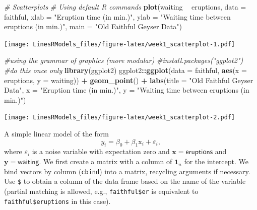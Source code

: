 \documentclass[]{book}
\newenvironment{Shaded}{\begin{snugshade}}{\end{snugshade}}
\newcommand{\KeywordTok}[1]{\textcolor[rgb]{0.13,0.29,0.53}{\textbf{#1}}}
\newcommand{\DataTypeTok}[1]{\textcolor[rgb]{0.13,0.29,0.53}{#1}}
\newcommand{\StringTok}[1]{\textcolor[rgb]{0.31,0.60,0.02}{#1}}
\newcommand{\CommentTok}[1]{\textcolor[rgb]{0.56,0.35,0.01}{\textit{#1}}}
\newcommand{\OperatorTok}[1]{\textcolor[rgb]{0.81,0.36,0.00}{\textbf{#1}}}
\newcommand{\NormalTok}[1]{#1}
\theoremstyle{definition}
\theoremstyle{definition}
\theoremstyle{definition}
\theoremstyle{remark}
\begin{document}
\begin{Shaded}
\begin{Highlighting}[]
\CommentTok{# Scatterplots}
\CommentTok{# Using default R commands}
\KeywordTok{plot}\NormalTok{(waiting }\OperatorTok{~}\StringTok{ }\NormalTok{eruptions, }\DataTypeTok{data =}\NormalTok{ faithful, }
     \DataTypeTok{xlab =} \StringTok{"Eruption time (in min.)"}\NormalTok{, }
     \DataTypeTok{ylab =} \StringTok{"Waiting time between eruptions (in min.)"}\NormalTok{,}
     \DataTypeTok{main =} \StringTok{"Old Faithful Geyser Data"}\NormalTok{)}
\end{Highlighting}
\end{Shaded}

\texttt{[image: LinesRModels\_files/figure-latex/week1\_scatterplot-1.pdf]}

\begin{Shaded}
\begin{Highlighting}[]
\CommentTok{#using the grammar of graphics (more modular)}
\CommentTok{#install.packages("ggplot2") #do this once only}
\KeywordTok{library}\NormalTok{(ggplot2)}
\NormalTok{ggplot2}\OperatorTok{::}\KeywordTok{ggplot}\NormalTok{(}\DataTypeTok{data =}\NormalTok{ faithful, }\KeywordTok{aes}\NormalTok{(}\DataTypeTok{x =}\NormalTok{ eruptions, }\DataTypeTok{y =}\NormalTok{ waiting)) }\OperatorTok{+}\StringTok{ }
\StringTok{  }\KeywordTok{geom_point}\NormalTok{() }\OperatorTok{+}\StringTok{  }
\StringTok{  }\KeywordTok{labs}\NormalTok{(}\DataTypeTok{title =} \StringTok{"Old Faithful Geyser Data"}\NormalTok{, }
       \DataTypeTok{x =} \StringTok{"Eruption time (in min.)"}\NormalTok{, }
       \DataTypeTok{y =} \StringTok{"Waiting time between eruptions (in min.)"}\NormalTok{)}
\end{Highlighting}
\end{Shaded}

\texttt{[image: LinesRModels\_files/figure-latex/week1\_scatterplot-2.pdf]}

A simple linear model of the form
\[y_i = \beta_0 + \beta_1 \mathrm{x}_i + \varepsilon_i,\] where
\(\varepsilon_i\) is a noise variable with expectation zero and
\(\mathbf{x} = \mathsf{eruptions}\) and
\(\boldsymbol{y} = \mathsf{waiting}\). We first create a matrix with a
column of \(\mathbf{1}_n\) for the intercept. We bind vectors by column
(\texttt{cbind}) into a matrix, recycling arguments if necessary. Use
\texttt{\$} to obtain a column of the data frame based on the name of
the variable (partial matching is allowed, e.g., \texttt{faithful\$er}
is equivalent to \texttt{faithful\$eruptions} in this case).
\end{document}
